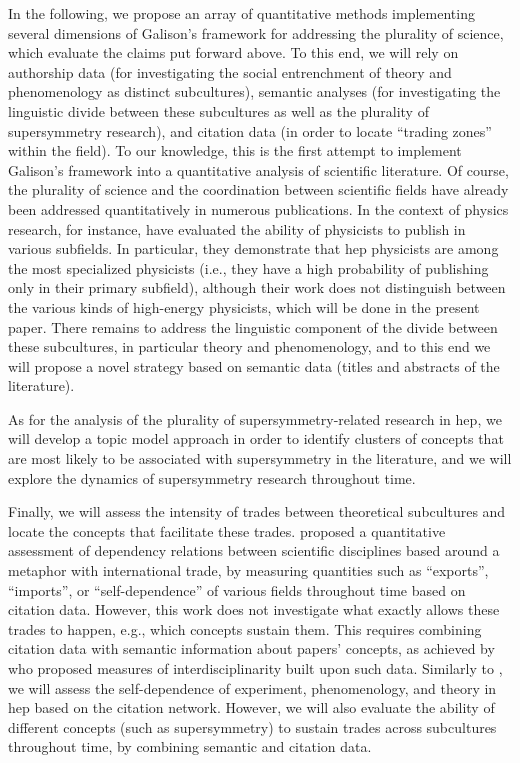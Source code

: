 \documentclass[smallextended]{svjour3}
\begin{document}
In the following, we propose an array of quantitative methods implementing several dimensions of Galison's framework for addressing the plurality of science, which evaluate the claims put forward above. To this end, we will rely on authorship data (for investigating the social entrenchment of theory and phenomenology as distinct subcultures), semantic analyses (for investigating the linguistic divide between these subcultures as well as the plurality of supersymmetry research), and citation data (in order to locate ``trading zones'' within the field). To our knowledge, this is the first attempt to implement Galison's framework into a quantitative analysis of scientific literature. Of course, the plurality of science and the coordination between scientific fields have already been addressed quantitatively in numerous publications. In the context of physics research, for instance, \citet{Battiston2019} have evaluated the ability of physicists to publish in various subfields. In particular, they demonstrate that \gls{hep} physicists are among the most specialized physicists (i.e., they have a high probability of publishing only in their primary subfield), although their work does not distinguish between the various kinds of high-energy physicists, which will be done in the present paper. There remains to address the linguistic component of the divide between these subcultures, in particular theory and phenomenology, and to this end we will propose a novel strategy based on semantic data (titles and abstracts of the literature).

As for the analysis of the plurality of supersymmetry-related research in \gls{hep}, we will develop a topic model approach in order to identify clusters of concepts that are most likely to be associated with supersymmetry in the literature, and we will explore the dynamics of supersymmetry research throughout time.

Finally, we will assess the intensity of trades between theoretical subcultures and locate the concepts that facilitate these trades. \citet{Yan2013} proposed a quantitative assessment of dependency relations between scientific disciplines based around a metaphor with international trade, by measuring quantities such as ``exports'', ``imports'', or ``self-dependence'' of various fields throughout time based on citation data. However, this work does not investigate what exactly allows these trades to happen, e.g., which concepts sustain them. This requires combining citation data with semantic information about papers' concepts, as achieved by \citet{Raimbault2019} who proposed measures of interdisciplinarity built upon such data. Similarly to \citealt{Yan2013}, we will assess the self-dependence of experiment, phenomenology, and theory in \gls{hep} based on the citation network. However, we will also evaluate the ability of different concepts (such as supersymmetry) to sustain trades across subcultures throughout time, by combining semantic and citation data.
\end{document}
